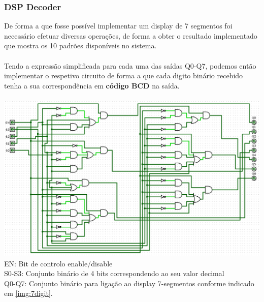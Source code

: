 \documentclass[12pt,a4paper,portrait]{article}
\begin{document}
		\subsubsection{DSP Decoder} \label{ssec:num2}
			De forma a que fosse possível implementar um display de 7 segmentos foi necessário efetuar diversas operações, de forma a obter o resultado implementado que mostra os 10 padrões disponíveis no sistema.\\\\
			Tendo a expressão simplificada para cada uma das saídas Q0-Q7, podemos então implementar o respetivo circuito de forma a que cada digito binário recebido tenha a sua correspondência em \textbf{código BCD} na saída.\\\\
			\includegraphics[width=1.0\textwidth]{imagens/dspdec}\\
			EN: Bit de controlo enable/disable\\
			S0-S3: Conjunto binário de 4 bits correspondendo ao seu valor decimal\\
			Q0-Q7: Conjunto binário para ligação ao display 7-segmentos conforme indicado em \ref{img:7digit}.\\\\
			
\end{document}

